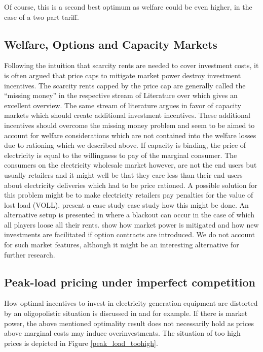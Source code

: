 Of course, this is a second best optimum as welfare could be even higher, in the case of a two part tariff.

\subsection{Welfare, Options and Capacity Markets}

Following the intuition that scarcity rents are needed to cover investment costs, it is often argued that price caps to mitigate market power destroy investment incentives. The scarcity rents capped by the price cap are generally called the "`missing money"' in the respective stream of Literature over which \cite{Cramton2006} gives an excellent overview.
The same stream of literature argues in favor of capacity markets which should create additional investment incentives. These additional incentives should overcome the missing money problem and seem to be aimed to account for welfare considerations which are not contained into the welfare losses due to rationing which we described above. If capacity is binding, the price of electricity is equal to the willingness to pay of the marginal consumer. The consumers on the electricity wholesale market however, are not the end users but usually retailers and it might well be that they care less than their end users about electricity deliveries which had to be price rationed. A possible solution for this problem might be to make electricity retailers pay penalties for the value of lost load (VOLL). \cite{Burger2007} present a case study case study how this might be done.
An alternative setup is presented in \cite{Boom2007} where a blackout can occur in the case of which all players loose all their rents. \cite{Chao2004} show how market power is mitigated and how new investments are facilitated if option contracts are introduced. We do not account for such market features, although it might be an interesting alternative for further research.

\subsection{Peak-load pricing under imperfect competition}

How optimal incentives to invest in electricity generation equipment are distorted by an oligopolistic situation is discussed in \cite{Fehr1995} and \cite{Brunekreeft2005} for example. If there is market power, the above mentioned optimality result does not necessarily hold as prices above marginal costs may induce overinvestments. The situation of too high prices is depicted in Figure \ref{peak_load_toohigh}.

